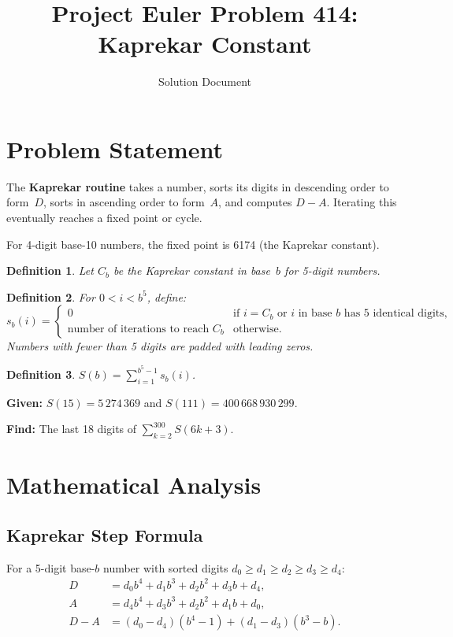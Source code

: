 \documentclass[11pt,a4paper]{article}
\title{Project Euler Problem 414: Kaprekar Constant}
\author{Solution Document}
\date{}
\newtheorem{definition}{Definition}
\begin{document}
\maketitle

\section{Problem Statement}

The \textbf{Kaprekar routine} takes a number, sorts its digits in descending order to form~$D$, sorts in ascending order to form~$A$, and computes $D - A$. Iterating this eventually reaches a fixed point or cycle.

For 4-digit base-10 numbers, the fixed point is 6174 (the Kaprekar constant).

\begin{definition}
Let $C_b$ be the Kaprekar constant in base~$b$ for 5-digit numbers.
\end{definition}

\begin{definition}
For $0 < i < b^5$, define:
\[
  s_b(i) = \begin{cases}
    0 & \text{if } i = C_b \text{ or } i \text{ in base } b \text{ has 5 identical digits}, \\
    \text{number of iterations to reach } C_b & \text{otherwise}.
  \end{cases}
\]
Numbers with fewer than 5 digits are padded with leading zeros.
\end{definition}

\begin{definition}
$S(b) = \displaystyle\sum_{i=1}^{b^5 - 1} s_b(i)$.
\end{definition}

\textbf{Given:} $S(15) = 5\,274\,369$ and $S(111) = 400\,668\,930\,299$.

\textbf{Find:} The last 18 digits of $\displaystyle\sum_{k=2}^{300} S(6k+3)$.

\section{Mathematical Analysis}

\subsection{Kaprekar Step Formula}

For a 5-digit base-$b$ number with sorted digits $d_0 \ge d_1 \ge d_2 \ge d_3 \ge d_4$:
\begin{align}
  D &= d_0 b^4 + d_1 b^3 + d_2 b^2 + d_3 b + d_4, \\
  A &= d_4 b^4 + d_3 b^3 + d_2 b^2 + d_1 b + d_0, \\
  D - A &= (d_0 - d_4)(b^4 - 1) + (d_1 - d_3)(b^3 - b).
\end{align}
\end{document}
